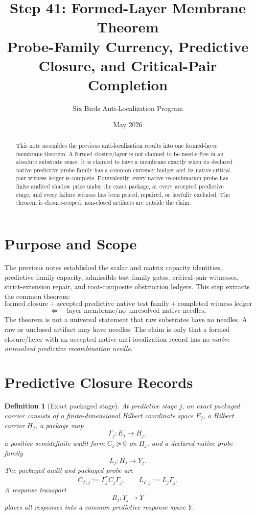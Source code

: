 \documentclass[11pt]{article}
\title{Step 41: Formed-Layer Membrane Theorem\\
\large Probe-Family Currency, Predictive Closure, and Critical-Pair Completion}
\author{Six Birds Anti-Localization Program}
\date{May 2026}
\newtheorem{definition}[theorem]{Definition}
\begin{document}
\maketitle

\begin{abstract}
This note assembles the previous anti-localization results into one formed-layer membrane theorem.  A formed closure/layer is not claimed to be needle-free in an absolute substrate sense.  It is claimed to have a membrane exactly when its declared native predictive probe family has a common currency budget and its native critical-pair witness ledger is complete.  Equivalently, every native recombination probe has finite audited shadow price under the exact package, at every accepted predictive stage, and every failure witness has been priced, repaired, or lawfully excluded.  The theorem is closure-scoped: non-closed artifacts are outside the claim.
\end{abstract}

\section{Purpose and Scope}
The previous notes established the scalar and matrix capacity identities, predictive family capacity, admissible test-family gates, critical-pair witnesses, strict-extension repair, and root-composite obstruction ledgers.  This step extracts the common theorem:
\[
\boxed{\text{formed closure}+\text{accepted predictive native test family}+\text{completed witness ledger}}
\]
\[
\boxed{\Longleftrightarrow\quad \text{layer membrane/no unresolved native needles}.}
\]
The theorem is not a universal statement that raw substrates have no needles.  A raw or unclosed artifact may have needles.  The claim is only that a formed closure/layer with an accepted native anti-localization record has no \emph{native unresolved predictive recombination needle}.

\section{Predictive Closure Records}

\begin{definition}[Exact packaged stage]
At predictive stage $j$, an exact packaged carrier consists of a finite-dimensional Hilbert coordinate space $E_j$, a Hilbert carrier $H_j$, a package map
\[
  \Gamma_j:E_j\to H_j,
\]
a positive semidefinite audit form $C_j\succeq0$ on $H_j$, and a declared native probe family
\[
  L_j:H_j\to Y_j.
\]
The packaged audit and packaged probe are
\[
  C_{\Gamma,j}:=\Gamma_j^*C_j\Gamma_j,
  \qquad
  L_{\Gamma,j}:=L_j\Gamma_j.
\]
A response transport
\[
  R_j:Y_j\to Y
\]
places all responses into a common predictive response space $Y$.
\end{definition}
\end{document}
